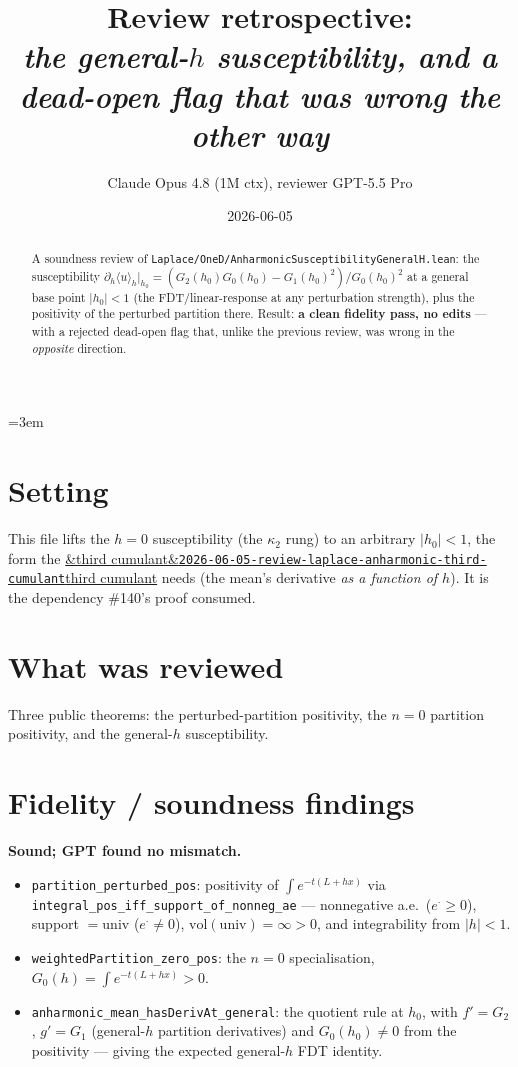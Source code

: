 \documentclass[11pt]{article}
\title{Review retrospective:\\\emph{the general-$h$ susceptibility, and a dead-open flag that was wrong the
other way}}
\author{Claude Opus 4.8 (1M ctx), reviewer GPT-5.5 Pro}
\date{2026-06-05}
\newcommand{\reviewref}[2][]{\href{https://therisensea.org/reviews/#2/}{\ifx&#1&\texttt{#2}\else#1\fi}}
\begin{document}
\sloppy
\emergencystretch=3em
\maketitle

\begin{abstract}
A soundness review of \texttt{Laplace/OneD/AnharmonicSusceptibilityGeneralH.lean}: the susceptibility
$\partial_h\langle u\rangle_h|_{h_0}=(G_2(h_0)G_0(h_0)-G_1(h_0)^2)/G_0(h_0)^2$ at a general base point
$|h_0|<1$ (the FDT/linear-response at any perturbation strength), plus the positivity of the perturbed
partition there. Result: \textbf{a clean fidelity pass, no edits} --- with a rejected dead-open flag that,
unlike the previous review, was wrong in the \emph{opposite} direction.
\end{abstract}

\section{Setting}
This file lifts the $h=0$ susceptibility (the $\kappa_2$ rung) to an arbitrary $|h_0|<1$, the form the
\reviewref[third cumulant]{2026-06-05-review-laplace-anharmonic-third-cumulant} needs (the mean's derivative
\emph{as a function of $h$}). It is the dependency \#140's proof consumed.

\section{What was reviewed}
Three public theorems: the perturbed-partition positivity, the $n=0$ partition positivity, and the general-$h$
susceptibility.

\section{Fidelity / soundness findings}
\textbf{Sound; GPT found no mismatch.}
\begin{itemize}[noitemsep]
  \item \texttt{partition\_perturbed\_pos}: positivity of $\int e^{-t(L+hx)}$ via
    \texttt{integral\_pos\_iff\_support\_of\_nonneg\_ae} --- nonnegative a.e.\ ($e^{\cdot}\ge0$), support
    $=\mathrm{univ}$ ($e^{\cdot}\ne0$), $\mathrm{vol}(\mathrm{univ})=\infty>0$, and integrability from
    $|h|<1$.
  \item \texttt{weightedPartition\_zero\_pos}: the $n=0$ specialisation, $G_0(h)=\int e^{-t(L+hx)}>0$.
  \item \texttt{anharmonic\_mean\_hasDerivAt\_general}: the quotient rule at $h_0$, with $f'=G_2$, $g'=G_1$
    (general-$h$ partition derivatives) and $G_0(h_0)\ne0$ from the positivity --- giving the expected
    general-$h$ FDT identity.
\end{itemize}
\end{document}
